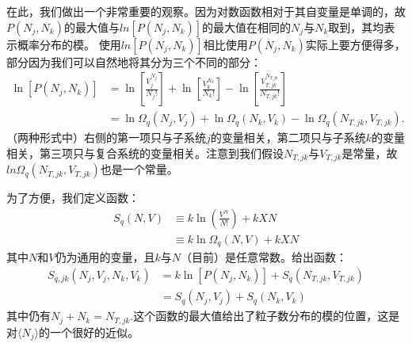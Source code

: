 \documentclass[UTF8]{ctexart}
\numberwithin{equation}{section}%
\numberwithin{figure}{section}%
\begin{document}
    在此，我们做出一个非常重要的观察。因为对数函数相对于其自变量是单调的，故$P(N_j,N_k)$的最大值与$ln[P(N_j,N_k)]$的最大值在相同的$N_j$与$N_k$取到，其均表示概率分布的模。
    使用$ln[P(N_j,N_k)]$相比使用$P(N_j,N_k)$实际上要方便得多，部分因为我们可以自然地将其分为三个不同的部分：
    \begin{equation}
        \begin{aligned}
            \ln \left[P\left(N_{j}, N_{k}\right)\right] &=\ln \left[\frac{V_{j}^{N_{j}}}{N_{j} !}\right]+\ln \left[\frac{V_{k}^{N_{k}}}{N_{k} !}\right]-\ln \left[\frac{V_{T, j k}^{N_{T, j k}}}{N_{T, j k} !}\right] \\
            &=\ln \Omega_{q}\left(N_{j}, V_{j}\right)+\ln \Omega_{q}\left(N_{k}, V_{k}\right)-\ln \Omega_{q}\left(N_{T, j k}, V_{T, j k}\right) .
            \end{aligned}
    \end{equation}
    （两种形式中）右侧的第一项只与子系统$j$的变量相关，第二项只与子系统$k$的变量相关，第三项只与复合系统的变量相关。注意到我们假设$N_{T,jk}$与$V_{T,jk}$是常量，故$ln\Omega_q(N_{T,jk},V_{T,jk})$也是一个常量。

    为了方便，我们定义函数：
    \begin{align}
            S_{q}(N, V)&\equiv k \ln \left(\frac{V^{N}}{N !}\right)+k X N \label{eq4.15}\\
            &\equiv k \ln \Omega_{q}(N, V)+k X N
        \end{align}
    其中$N$和$V$仍为通用的变量，且$k$与$N$（目前）是任意常数。给出函数：
    \begin{equation}
        \begin{aligned}\label{eq4.17}
            S_{q, j k}\left(N_{j}, V_{j}, N_{k}, V_{k}\right) &=k \ln \left[P\left(N_{j}, N_{k}\right)\right]+S_{q}\left(N_{T, j k}, V_{T, j k}\right) \\
            &=S_{q}\left(N_{j}, V_{j}\right)+S_{q}\left(N_{k}, V_{k}\right)
            \end{aligned}
    \end{equation}
    其中仍有$N_j+N_k=N_{T,jk}$.这个函数的最大值给出了粒子数分布的模的位置，这是对$\langle{N_j}\rangle$的一个很好的近似。
\end{document}
